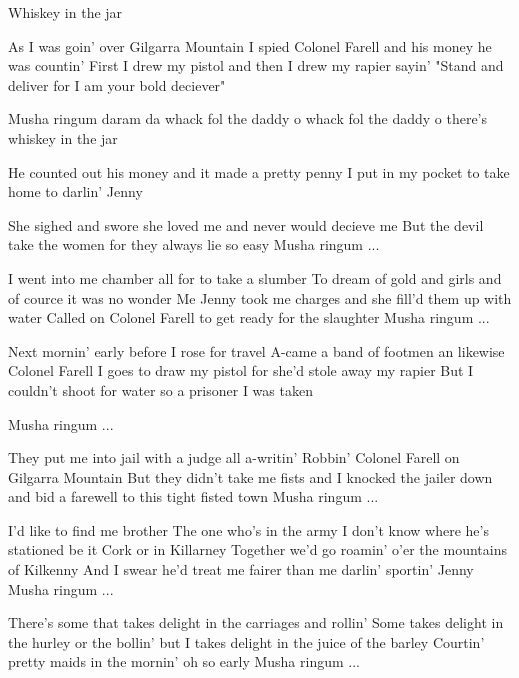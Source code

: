 \begin{sang}{Whiskey in the jar}{}
\begin{vers}
As I was goin' over Gilgarra Mountain
I spied Colonel Farell
and his money he was countin'
First I drew my pistol
and then I drew my rapier
sayin' "Stand and deliver
for I am your bold deciever"
\end{vers}
\begin{omkvaed}
Musha ringum daram da
whack fol the daddy o
whack fol the daddy o
there's whiskey in the jar
\end{omkvaed}
\vspace{-5mm}
\begin{vers}
He counted out his money
and it made a pretty penny
I put in my pocket
to take home to darlin' Jenny
\end{vers}
\begin{vers}
She sighed and swore she loved me
and never would decieve me
But the devil take the women
for they always lie so easy
Musha ringum ...
\end{vers}
\begin{vers}
I went into me chamber
all for to take a slumber
To dream of gold and girls
and of cource it was no wonder
Me Jenny took me charges
and she fill'd them up with water
Called on Colonel Farell
to get ready for the slaughter
Musha ringum ...
\end{vers}
\vspace{2cm}
\begin{vers}
Next mornin' early
before I rose for travel
A-came a band of footmen
an likewise Colonel Farell
I goes to draw my pistol
for she'd stole away my rapier
But I couldn't shoot for water
so a prisoner I was taken

Musha ringum ...
\end{vers}
\begin{vers}
They put me into jail with
a judge all a-writin'
Robbin' Colonel Farell
on Gilgarra Mountain
But they didn't take me fists
and I knocked the jailer down
and bid a farewell 
to this tight fisted town
Musha ringum ...
\end{vers}
\begin{vers}
I'd like to find me brother
The one who's in the army
I don't know where he's stationed
be it Cork or in Killarney
Together we'd go roamin'
o'er the mountains of Kilkenny
And I swear he'd treat me fairer
than me darlin' sportin' Jenny
Musha ringum ...
\end{vers}
\begin{vers}
There's some that takes delight
in the carriages and rollin'
Some takes delight
in the hurley or the bollin'
but I takes delight
in the juice of the barley
Courtin' pretty maids
in the mornin' oh so early
Musha ringum ...
\end{vers}
\laps
\end{sang}